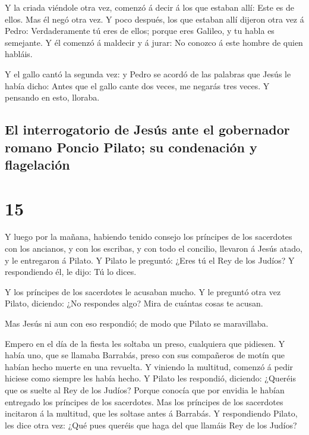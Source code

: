  Y la criada viéndole otra vez, comenzó á decir á los que
estaban allí: Este es de ellos.  Mas él negó otra vez. Y
poco después, los que estaban allí dijeron otra vez á Pedro:
Verdaderamente tú eres de ellos; porque eres Galileo, y tu habla es
semejante.  Y él comenzó á maldecir y á jurar: No conozco
á este hombre de quien habláis.

 Y el gallo cantó la segunda vez: y Pedro se acordó de
las palabras que Jesús le había dicho: Antes que el gallo cante dos
veces, me negarás tres veces. Y pensando en esto, lloraba.

\hypertarget{el-interrogatorio-de-jesuxfas-ante-el-gobernador-romano-poncio-pilato-su-condenaciuxf3n-y-flagelaciuxf3n}{%
\subsection{El interrogatorio de Jesús ante el gobernador romano Poncio
Pilato; su condenación y
flagelación}\label{el-interrogatorio-de-jesuxfas-ante-el-gobernador-romano-poncio-pilato-su-condenaciuxf3n-y-flagelaciuxf3n}}

\hypertarget{section-14}{%
\section{15}\label{section-14}}

 Y luego por la mañana, habiendo tenido consejo los
príncipes de los sacerdotes con los ancianos, y con los escribas, y con
todo el concilio, llevaron á Jesús atado, y le entregaron á Pilato.
 Y Pilato le preguntó: ¿Eres tú el Rey de los Judíos? Y
respondiendo él, le dijo: Tú lo dices.

 Y los príncipes de los sacerdotes le acusaban mucho.
 Y le preguntó otra vez Pilato, diciendo: ¿No respondes
algo? Mira de cuántas cosas te acusan.

 Mas Jesús ni aun con eso respondió; de modo que Pilato se
maravillaba.

 Empero en el día de la fiesta les soltaba un preso,
cualquiera que pidiesen.  Y había uno, que se llamaba
Barrabás, preso con sus compañeros de motín que habían hecho muerte en
una revuelta.  Y viniendo la multitud, comenzó á pedir
hiciese como siempre les había hecho.  Y Pilato les
respondió, diciendo: ¿Queréis que os suelte al Rey de los Judíos?
 Porque conocía que por envidia le habían entregado los
príncipes de los sacerdotes.  Mas los príncipes de los
sacerdotes incitaron á la multitud, que les soltase antes á Barrabás.
 Y respondiendo Pilato, les dice otra vez: ¿Qué pues
queréis que haga del que llamáis Rey de los Judíos?


